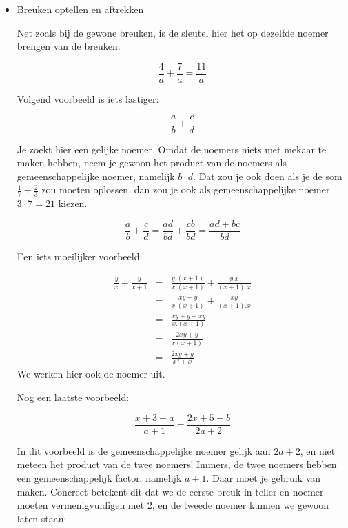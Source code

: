 \begin{itemize}
	\item{Breuken optellen en aftrekken}
	
	\noindent Net zoals bij de gewone breuken, is de sleutel hier het
	op dezelfde noemer brengen van de breuken:
	
	\begin{equation*}
	{\displaystyle \frac{4}{a}+\frac{7}{a}=\frac{11}{a}}
	\end{equation*}
	
	\noindent Volgend voorbeeld is iets lastiger:
	
	\begin{equation*}
		{\displaystyle \frac{a}{b}+\frac{c}{d}}
	\end{equation*}
	
	\noindent Je zoekt hier een gelijke noemer. Omdat de noemers niets
	met mekaar te maken hebben, neem je gewoon het product van de noemers
	als gemeenschappelijke noemer, namelijk $b\cdot d$. Dat zou je ook
	doen als je de som $\frac{1}{7}+\frac{2}{3}$ zou moeten oplossen,
	dan zou je ook als gemeenschappelijke noemer $3\cdot7=21$ kiezen.
	
	\begin{equation*}
		{\displaystyle \frac{a}{b}+\frac{c}{d}=\frac{ad}{bd}+\frac{cb}{bd}=\frac{ad+bc}{bd}}
	\end{equation*}
		
	\noindent Een iets moeilijker voorbeeld:
	
	\begin{eqnarray*}
		{\displaystyle \frac{y}{x}+\frac{y}{x+1}} & = & {\displaystyle \frac{y.(x+1)}{x.(x+1)}+\frac{y.x}{(x+1).x}} \\
		& = & {\displaystyle \frac{xy+y}{x.(x+1)}+\frac{xy}{(x+1).x}} \\
		& = & {\displaystyle \frac{xy+y+xy}{x.(x+1)}} \\
		& = & {\displaystyle \frac{2xy+y}{x(x+1)}} \\
		& = & {\displaystyle \frac{2xy+y}{x^{2}+x}} 
	\end{eqnarray*}
	We werken hier ook de noemer uit.
	
	
	\noindent \medskip{}
	Nog een laatste voorbeeld:
	
	\begin{equation*}
	{\displaystyle \frac{x+3+a}{a+1}-\frac{2x+5-b}{2a+2}}
	\end{equation*}
	
	\noindent In dit voorbeeld is de gemeenschappelijke noemer gelijk
	aan $2a+2$, en niet meteen het product van de twee noemers! Immers,
	de twee noemers hebben een gemeenschappelijk factor, namelijk $a+1$.
	Daar moet je gebruik van maken. Concreet betekent dit dat we de eerste
	breuk in teller en noemer moeten vermenigvuldigen met 2, en de tweede
	noemer kunnen we gewoon laten staan:
	

\end{itemize}
